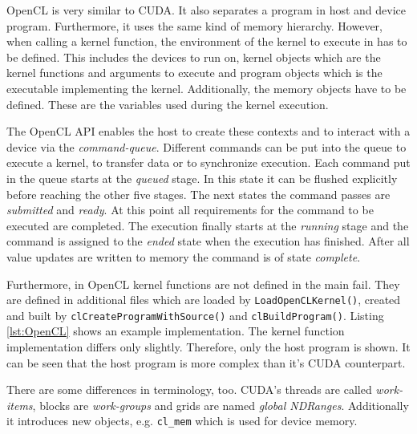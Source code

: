 \documentclass[a4paper,12pt]{llncs}
\numberwithin{equation}{section}
\begin{document}
  OpenCL is very similar to CUDA.
  It also separates a program in host and device program.
  Furthermore, it uses the same kind of memory hierarchy.
  However, when calling a kernel function, the environment of the kernel to execute in has to be defined.
  This includes the devices to run on, kernel objects which are the kernel functions and arguments to execute and program objects which is the executable implementing the kernel.
  Additionally, the memory objects have to be defined.
  These are the variables used during the kernel execution.~\cite{Khronos.2019}
  
  The OpenCL API enables the host to create these contexts and to interact with a device via the \textit{command-queue}.
  Different commands can be put into the queue to execute a kernel, to transfer data or to synchronize execution.
  Each command put in the queue starts at the \textit{queued} stage.
  In this state it can be flushed explicitly before reaching the other five stages.
  The next states the command passes are \textit{submitted} and \textit{ready}.
  At this point all requirements for the command to be executed are completed.
  The execution finally starts at the \textit{running} stage and the command is assigned to the \textit{ended} state when the execution has finished.
  After all value updates are written to memory the command is of state \textit{complete}.
  
  Furthermore, in OpenCL kernel functions are not defined in the main fail.
  They are defined in additional files which are loaded by \texttt{LoadOpenCLKernel()}, created and built by \texttt{clCreateProgramWithSource()} and \texttt{clBuildProgram()}.
  Listing \ref{lst:OpenCL} shows an example implementation.
  The kernel function implementation differs only slightly.
  Therefore, only the host program is shown.
  It can be seen that the host program is more complex than it's CUDA counterpart.
    
  There are some differences in terminology, too.
  CUDA's threads are called \textit{work-items}, blocks are \textit{work-groups} and grids are named \textit{global NDRanges}.
  Additionally it introduces new objects, e.g. \texttt{cl\_mem} which is used for device memory.
  
\end{document}
